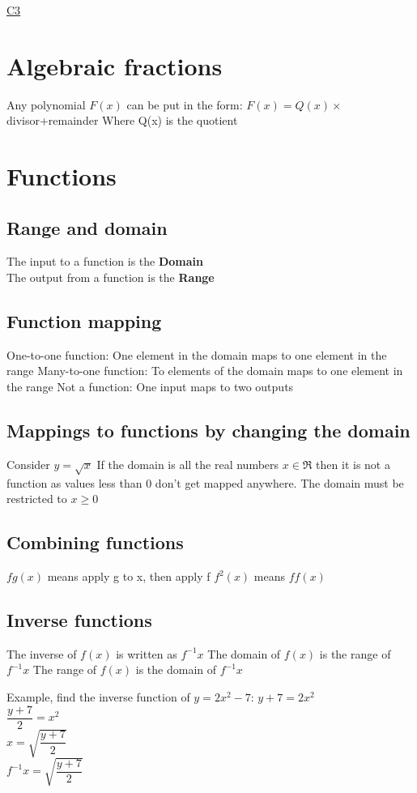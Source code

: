 \documentclass{article}[18pt]
\begin{document}
\begin{center}
\underline{\huge C3}
\end{center}
\begin{obeylines}

\section{Algebraic fractions}
Any polynomial $F(x)$ can be put in the form:
$F(x)=Q(x)\times$divisor+remainder
Where Q(x) is the quotient
\section{Functions}
\subsection{Range and domain}
The input to a function is the \textbf{Domain}\\
The output from a function is the \textbf{Range}
\subsection{Function mapping}
One-to-one function: One element in the domain maps to one element in the range
Many-to-one function: To elements of the domain maps to one element in the range
Not a function: One input maps to two outputs
\subsection{Mappings to functions by changing the domain}
Consider $y=\sqrt{x}$
If the domain is all the real numbers $x \in \Re$ then it is not a function as values less than 0 don't get mapped anywhere.
The domain must be restricted to $x\geq 0$
\subsection{Combining functions}
$fg(x)$ means apply g to x, then apply f
$f^2(x)$ means $ff(x)$
\subsection{Inverse functions}
The inverse of $f(x)$ is written as $f^{-1}x$
The domain of $f(x)$ is the range of $f^{-1}x$
The range of $f(x)$ is the domain of $f^{-1}x$

Example, find the inverse function of $y=2x^2-7$:
$y+7=2x^2$\\
$\dfrac{y+7}{2}=x^2$\\
$x=\sqrt{\dfrac{y+7}{2}}$\\
$f^{-1}x=\sqrt{\dfrac{y+7}{2}}$\\


\end{obeylines}
\end{document}
